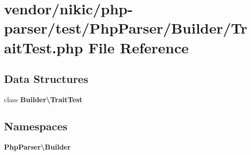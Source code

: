 \section{vendor/nikic/php-\/parser/test/\+Php\+Parser/\+Builder/\+Trait\+Test.php File Reference}
\label{_trait_test_8php}
\subsection*{Data Structures}
\begin{DoxyCompactItemize}
\item 
class {\bf Builder\textbackslash{}\+Trait\+Test}
\end{DoxyCompactItemize}
\subsection*{Namespaces}
\begin{DoxyCompactItemize}
\item 
 {\bf Php\+Parser\textbackslash{}\+Builder}
\end{DoxyCompactItemize}
